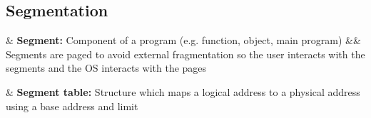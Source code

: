 \subsection{Segmentation}
	\label{subsec:memory-management:segmentation}
\begin{easylist}

& \textbf{Segment:} Component of a program (e.g. function, object, main program)
	&& Segments are paged to avoid external fragmentation so the user interacts with the segments and the OS interacts with the pages

& \textbf{Segment table:} Structure which maps a logical address to a physical address using a base address and limit

\end{easylist}
\clearpage